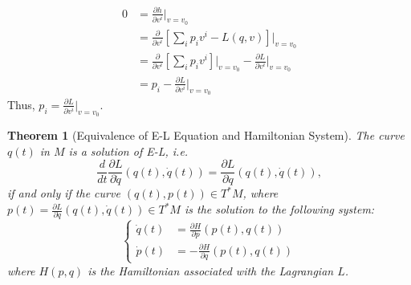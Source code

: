 \documentclass{article}
\newcommand{\pd}[1]{\frac{\partial}{\partial #1}}
\newcommand{\pdof}[2]{\frac{\partial #1}{\partial #2}}
\newtheorem{thm}{Theorem}
\begin{document}
\begin{align*}
    0&=\pdof{h}{v^i}\big|_{v=v_0}\\
    &=\pd{v^i}\left[\sum_i p_iv^i - L(q,v)\right]\big|_{v=v_0}\\
    &=\pd{v^i}\left[\sum_i p_iv^i\right]\big|_{v=v_0} - \pdof{L}{v^i}\big|_{v=v_0}\\
    &=p_i - \pdof{L}{v^i}\big|_{v=v_0}
\end{align*}
Thus, $p_i = \pdof{L}{v^i}\big|_{v=v_0}$.
\begin{thm}[Equivalence of E-L Equation and Hamiltonian System]
    The curve $q(t)$ in $M$ is a solution of E-L, i.e. 
    \[\frac{d}{dt}\pdof{L}{\dot q}(q(t),\dot q(t)) = \pdof{L}{q}(q(t),\dot q(t)),\]
    if and only if the curve $(q(t),p(t))\in T^*M$, where $p(t) = \pdof{L}{\dot q}(q(t),\dot q(t))\in T^*M$ is the solution to the following system:
    \[\left\{\begin{aligned}
        \dot q(t) &= \pdof{H}{p}(p(t),q(t))\\
        \dot p(t) &= -\pdof{H}{q}(p(t),q(t))
    \end{aligned}\right.\]
    where $H(p,q)$ is the Hamiltonian associated with the Lagrangian $L$.
\end{thm}
\end{document}
